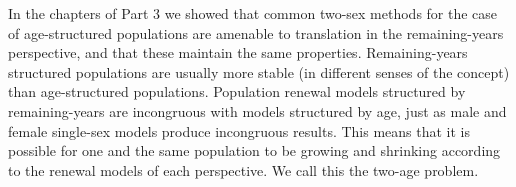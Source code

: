 In the chapters of Part 3 we showed that common two-sex
methods for the case of age-structured populations are amenable to translation
in the remaining-years perspective, and that these maintain the same properties.
Remaining-years structured populations are usually more stable (in different
senses of the concept) than age-structured populations. Population renewal models structured
by remaining-years are incongruous with models structured by age, just as male and 
female single-sex models produce incongruous results. This means that it is
possible for one and the same population to be growing and shrinking according
to the renewal models of each perspective. We call this the two-age problem.
